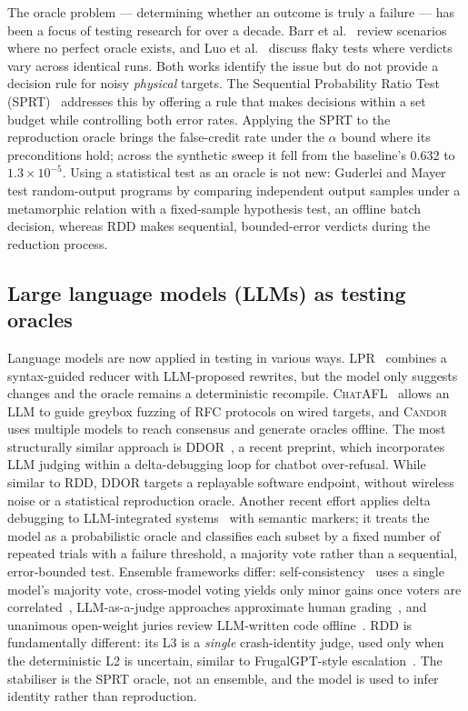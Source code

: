 The oracle problem --- determining whether an outcome is truly a failure --- has
been a focus of testing research for over a decade. Barr et
al.~\cite{oracleproblem2015} review scenarios where no perfect oracle exists, and
Luo et al.~\cite{flakytests2014} discuss flaky tests where verdicts vary across
identical runs. Both works identify the issue but do not provide a decision rule
for noisy \emph{physical} targets. The Sequential Probability Ratio Test
(SPRT)~\cite{sprt1945} addresses this by offering a rule that makes decisions within
a set budget while controlling both error rates. Applying the SPRT to the reproduction oracle brings the false-credit rate under the
$\alpha$ bound where its preconditions hold; across the synthetic sweep it fell from the
baseline's 0.632 to $1.3\times10^{-5}$. Using a statistical test as an oracle is not new: Guderlei and
Mayer~\cite{statoracle2007} test random-output programs by comparing independent
output samples under a metamorphic relation with a fixed-sample hypothesis test, an
offline batch decision, whereas RDD makes sequential, bounded-error verdicts during
the reduction process.

\subsection{Large language models (LLMs) as testing oracles}

Language models are now applied in testing in various ways.
\textsc{LPR}~\cite{lpr2024} combines a syntax-guided reducer with LLM-proposed
rewrites, but the model only suggests changes and the oracle remains a
deterministic recompile. \textsc{ChatAFL}~\cite{chatafl2024} allows an LLM to guide
greybox fuzzing of RFC protocols on wired targets, and
\textsc{Candor}~\cite{candor2025} uses multiple models to reach consensus and
generate oracles offline. The most structurally similar approach is
\textsc{DDOR}~\cite{ddor2026}, a recent preprint, which incorporates LLM judging
within a delta-debugging loop for chatbot over-refusal. While similar to RDD, DDOR
targets a replayable software endpoint, without wireless noise or a statistical
reproduction oracle. Another recent effort applies delta debugging to
LLM-integrated systems~\cite{ddllm2026} with semantic markers; it treats the model
as a probabilistic oracle and classifies each subset by a fixed number of repeated
trials with a failure threshold, a majority vote rather than a sequential,
error-bounded test. Ensemble frameworks differ:
self-consistency~\cite{selfconsistency2023} uses a single model's majority vote,
cross-model voting yields only minor gains once voters are
correlated~\cite{condorcetllm2024}, LLM-as-a-judge approaches approximate human
grading~\cite{llmjudge2023}, and unanimous open-weight juries review LLM-written
code offline~\cite{llmjuries2026}. RDD is fundamentally different: its L3 is a
\emph{single} crash-identity judge, used only when the deterministic L2 is uncertain,
similar to FrugalGPT-style escalation~\cite{frugalgpt2023}. The stabiliser is the
SPRT oracle, not an ensemble, and the model is used to infer identity rather than
reproduction.

